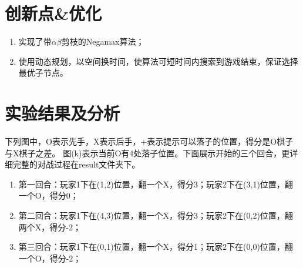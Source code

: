 \documentclass[10pt,letterpaper]{ctexart}
\begin{document}
\section{创新点\&优化}
\begin{enumerate}[itemindent=2.5em,label=\arabic*、]
  \item 实现了带$\alpha \beta$剪枝的Negamax算法；
  \item 使用动态规划，以空间换时间，使算法可短时间内搜索到游戏结束，保证选择最优子节点。
\end{enumerate}

\section{实验结果及分析}
下列图中，O表示先手，X表示后手，+表示提示可以落子的位置，得分是O棋子与X棋子之差。
图(k)表示当前O有4处落子位置。下面展示开始的三个回合，更详细完整的对战过程在result文件夹下。
\begin{figure}[H]
  \centering
\end{figure}

\begin{enumerate}[itemindent=2.5em,label=\arabic*、]
  \item 第一回合：玩家1下在(1,2)位置，翻一个X，得分3；玩家2下在(3,1)位置，翻一个O，得分0；
  \item 第二回合：玩家1下在(4,3)位置，翻一个X，得分3；玩家2下在(0,2)位置，翻两个X，得分-2；
  \item 第三回合：玩家1下在(0,1)位置，翻一个X，得分1；玩家2下在(0,0)位置，翻一个O，得分-2；
\end{enumerate}
\end{document}
